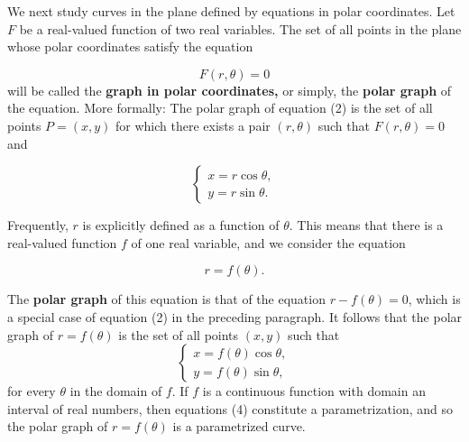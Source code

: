 \begin{example}

We next study curves in the plane defined by equations in polar coordinates. Let $F$ be a real-valued function of two real variables. The set of all points in the plane whose polar coordinates satisfy the equation

\begin{equation}
F(r, \theta) = 0   
\label{eq10.6.2}
\end{equation}
will be called the \textbf{graph in polar coordinates,} or simply, the \textbf{polar graph} of the equation. More formally: The polar graph of equation (2) is the set of all points $P = (x, y)$ for which there exists a pair $(r, \theta)$ such that $F(r, \theta) = 0$ and

$$
\left \{\begin{array}{c}
x = r \cos \theta,\\
y = r \sin \theta.
\end{array}
\right .
$$

Frequently, $r$ is explicitly defined as a function of $\theta$. This means that there is a real-valued function $f$ of one real variable, and we consider the equation

\begin{equation}
r = f(\theta)   .
\label{eq10.6.3}
\end{equation}

\noindent The \textbf{polar graph} of this equation is that of the equation $r - f(\theta) = 0$, which is a special case of equation (2) in the preceding paragraph. It follows that the polar graph of $r = f (\theta)$ is the set of all points $(x, y)$ such that 
\begin{equation}
\left \{ \begin{array}{c}
x = f(\theta) \cos \theta, \\
y = f(\theta) \sin \theta,
\end{array}
\right .
\label{eq10.6.4}
\end{equation}
for every $\theta$ in the domain of $f$. If $f$ is a continuous function with domain an interval of real numbers, then equations (4) constitute a parametrization, and so the polar graph of $r = f(\theta)$ is a parametrized curve.
\end{example}


